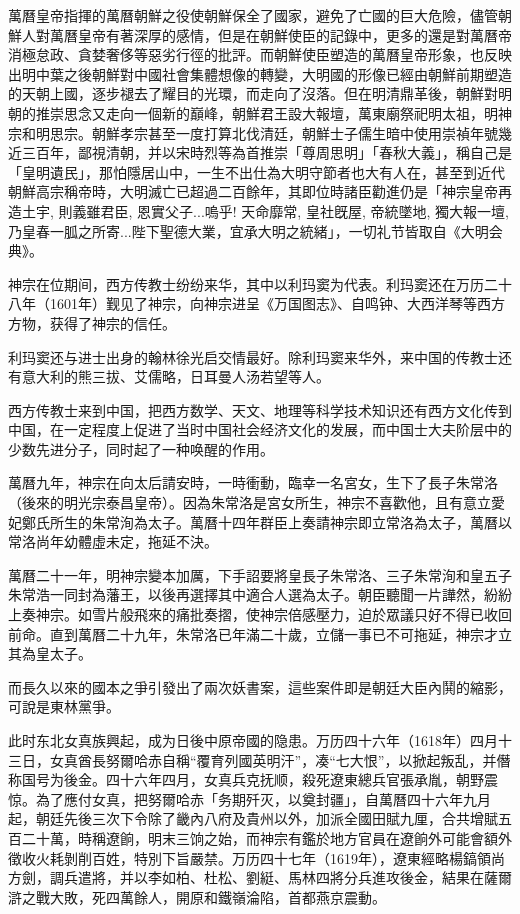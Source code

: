 萬曆皇帝指揮的萬曆朝鮮之役使朝鮮保全了國家，避免了亡國的巨大危險，儘管朝鮮人對萬曆皇帝有著深厚的感情，但是在朝鮮使臣的記錄中，更多的還是對萬曆帝消極怠政、貪婪奢侈等惡劣行徑的批評。而朝鮮使臣塑造的萬曆皇帝形象，也反映出明中葉之後朝鮮對中國社會集體想像的轉變，大明國的形像已經由朝鮮前期塑造的天朝上國，逐步褪去了耀目的光環，而走向了沒落。但在明清鼎革後，朝鮮對明朝的推崇思念又走向一個新的巔峰，朝鮮君王設大報壇，萬東廟祭祀明太祖，明神宗和明思宗。朝鮮孝宗甚至一度打算北伐清廷，朝鮮士子儒生暗中使用崇禎年號幾近三百年，鄙視清朝，并以宋時烈等為首推崇「尊周思明」「春秋大義」，稱自己是「皇明遺民」，那怕隱居山中，一生不出仕為大明守節者也大有人在，甚至到近代朝鮮高宗稱帝時，大明滅亡已超過二百餘年，其即位時諸臣勸進仍是「神宗皇帝再造土宇, 則義雖君臣, 恩實父子...嗚乎! 天命靡常, 皇社旣屋, 帝統墜地, 獨大報一壇, 乃皇春一胍之所寄...陛下聖德大業，宜承大明之統緒」，一切礼节皆取自《大明会典》。

神宗在位期间，西方传教士纷纷来华，其中以利玛窦为代表。利玛窦还在万历二十八年（1601年）觐见了神宗，向神宗进呈《万国图志》、自鸣钟、大西洋琴等西方方物，获得了神宗的信任。

利玛窦还与进士出身的翰林徐光启交情最好。除利玛窦来华外，来中国的传教士还有意大利的熊三拔、艾儒略，日耳曼人汤若望等人。

西方传教士来到中国，把西方数学、天文、地理等科学技术知识还有西方文化传到中国，在一定程度上促进了当时中国社会经济文化的发展，而中国士大夫阶层中的少数先进分子，同时起了一种唤醒的作用。

萬曆九年，神宗在向太后請安時，一時衝動，臨幸一名宮女，生下了長子朱常洛（後來的明光宗泰昌皇帝）。因為朱常洛是宮女所生，神宗不喜歡他，且有意立愛妃鄭氏所生的朱常洵為太子。萬曆十四年群臣上奏請神宗即立常洛為太子，萬曆以常洛尚年幼體虛未定，拖延不決。

萬曆二十一年，明神宗變本加厲，下手詔要將皇長子朱常洛、三子朱常洵和皇五子朱常浩一同封為藩王，以後再選擇其中適合人選為太子。朝臣聽聞一片譁然，紛紛上奏神宗。如雪片般飛來的痛批奏摺，使神宗倍感壓力，迫於眾議只好不得已收回前命。直到萬曆二十九年，朱常洛已年滿二十歲，立儲一事已不可拖延，神宗才立其為皇太子。

而長久以來的國本之爭引發出了兩次妖書案，這些案件即是朝廷大臣內鬨的縮影，可說是東林黨爭。

此时东北女真族興起，成为日後中原帝國的隐患。万历四十六年（1618年）四月十三日，女真酋長努爾哈赤自稱“覆育列國英明汗”，凑“七大恨”，以掀起叛乱，并僭称国号为後金。四十六年四月，女真兵克抚顺，殺死遼東總兵官張承胤，朝野震惊。為了應付女真，把努爾哈赤「务期歼灭，以奠封疆」，自萬曆四十六年九月起，朝廷先後三次下令除了畿內八府及貴州以外，加派全國田賦九厘，合共增賦五百二十萬，時稱遼餉，明末三饷之始，而神宗有鑑於地方官員在遼餉外可能會額外徵收火耗剝削百姓，特別下旨嚴禁。万历四十七年（1619年），遼東經略楊鎬領尚方劍，調兵遣將，并以李如柏、杜松、劉綎、馬林四將分兵進攻後金，結果在薩爾滸之戰大敗，死四萬餘人，開原和鐵嶺淪陷，首都燕京震動。

